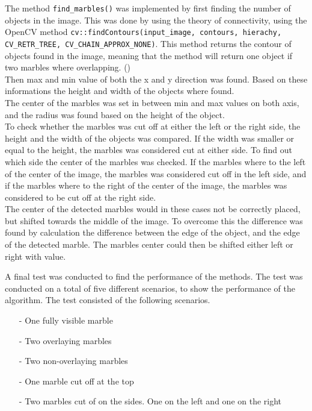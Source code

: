 \documentclass[../Head/Main.tex]{subfiles}
\begin{document}
The method \texttt{find\_marbles()} was implemented by first finding the number of objects in the image. This was done by using the theory of connectivity, using the OpenCV method \texttt{cv::findContours(input\_image, contours, hierachy, CV\_RETR\_TREE, CV\_CHAIN\_APPROX\_NONE)}. This method returns the contour of objects found in the image, meaning that the method will return one object if two marbles where overlapping. (\cite[66-70]{OCV})\\
Then max and min value of both the x and y direction was found. Based on these informations the height and width of the objects where found.\\
The center of the marbles was set in between min and max values on both axis, and the radius was found based on the height of the object.\\
To check whether the marbles was cut off at either the left or the right side, the height and the width of the objects was compared. If the width was smaller or equal to the height, the marbles was considered cut at either side. To find out which side the center of the marbles was checked. If the marbles where to the left of the center of the image, the marbles was considered cut off in the left side, and if the marbles where to the right of the center of the image, the marbles was considered to be cut off at the right side.\\
The center of the detected marbles would in these cases not be correctly placed, but shifted towards the middle of the image. To overcome this the difference was found by calculation the difference between the edge of the object, and the edge of the detected marble. The marbles center could then be shifted either left or right with value.\par 
A final test was conducted to find the performance of the methods. The test was conducted on a total of five different scenarios, to show the performance of the algorithm. The test consisted of the following scenarios.
\begin{itemize} \vspace{-5pt}
	\item[-] One fully visible marble \vspace{-7pt}
	\item[-] Two overlaying marbles \vspace{-7pt}
	\item[-] Two non-overlaying marbles \vspace{-7pt}
	\item[-] One marble cut off at the top \vspace{-7pt}
	\item[-] Two marbles cut of on the sides. One on the left and one on the right
\end{itemize} \vspace{-5pt}
\end{document}
